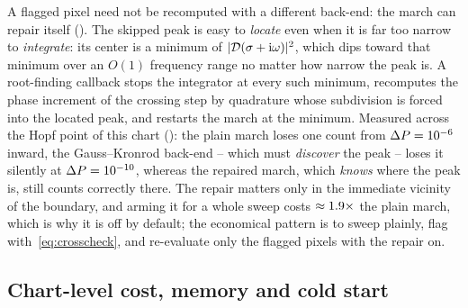 A flagged pixel need not be recomputed with a different back-end: the march
can repair itself (). The skipped peak is easy to
\emph{locate} even when it is far too narrow to \emph{integrate}: its center
is a minimum of $|\mathcal{D}(\sigma+\mathrm{i}\omega)|^2$, which dips toward that
minimum over an $O(1)$ frequency range no matter how narrow the peak is. A
root-finding callback stops the integrator at every such minimum,
recomputes the phase increment of the crossing step by quadrature whose
subdivision is forced into the located peak, and restarts the march at the
minimum. Measured across the Hopf point of this chart
(): the plain march loses one count from
$\Delta P = 10^{-6}$ inward, the Gauss--Kronrod back-end -- which
must \emph{discover} the peak -- loses it silently at
$\Delta P = 10^{-10}$, whereas the repaired march, which \emph{knows}
where the peak is, still counts correctly there. The repair matters only in
the immediate vicinity of the boundary, and arming it for a whole sweep
costs $\approx1.9\times$ the plain march, which is why it is
off by default; the economical pattern is to sweep plainly, flag
with~\eqref{eq:crosscheck}, and re-evaluate only the flagged pixels with
the repair on.


\subsection{Chart-level cost, memory and cold start}\label{sec:performance-cost}

\begin{table}[tb]
  \centering
  \caption{Warm chart-level costs (median of repeated runs,
  \NumThreads{}~threads): full brute-force sweeps for three systems of
  increasing evaluation cost, with allocated memory. The last column counts
  the points at which the back-end's $\Zint$ deviates from a
  tight-tolerance reference of the same chart: the adaptive back-ends are
  required to match everywhere before their time is recorded, while the
  fixed-step back-end -- whose resolution is set by hand -- reports its
  misses.}\label{tab:gridtimings}
\end{table}

\begin{table}[tb]
  \centering
  \caption{The two operating points of the method on the same
  $100\times100$ chart: the \emph{accurate} preset (the default tolerance)
  and a \emph{fast} preset for first exploration. The last column counts
  the points whose $\Zint$ differs from a tight reference, i.e.\ the price
  of the fast preset, which buys roughly a factor of two in
  time.}\label{tab:presets}
\end{table}

